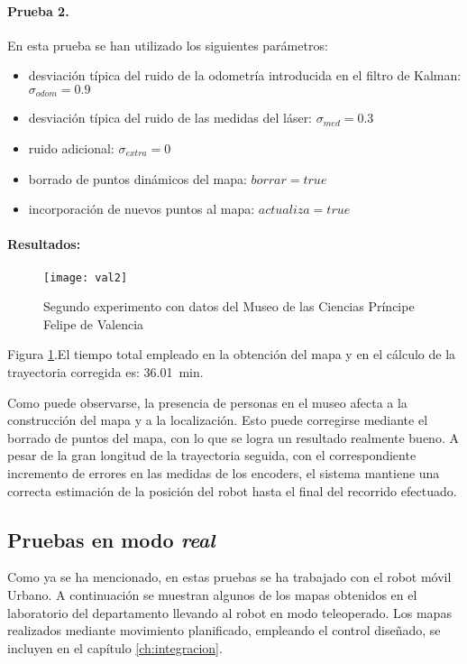 \paragraph{Prueba 2.} En esta prueba se han utilizado los siguientes parámetros:
\begin{itemize}
  \item desviación típica del ruido de la odometría introducida en el filtro de Kalman: $\sigma_{odom} = 0.9$
  \item desviación típica del ruido de las medidas del láser: $\sigma_{med} = 0.3$
  \item ruido adicional: $\sigma_{extra} = 0$
  \item borrado de puntos dinámicos del mapa: $borrar = true$
  \item incorporación de nuevos puntos al mapa: $actualiza = true$
\end{itemize}

\paragraph{Resultados:}
\begin{figure}[h]
  \centering\texttt{[image: val2]}\\
  \caption{Segundo experimento con datos del Museo de las Ciencias Príncipe Felipe de Valencia}\label{fg:val2}
\end{figure}

Figura \ref{fg:val2}.El tiempo total empleado en la obtención del mapa y en el cálculo de la trayectoria corregida es: 36.01~min.

Como puede observarse, la presencia de personas en el museo afecta a la construcción del mapa y a la localización. Esto puede corregirse mediante el borrado de puntos del mapa, con lo que se logra un resultado realmente bueno. A pesar de la gran longitud de la trayectoria seguida, con el correspondiente incremento de errores en las medidas de los encoders, el sistema mantiene una correcta estimación de la posición del robot hasta el final del recorrido efectuado.

\subsection{Pruebas en modo \emph{real}}
Como ya se ha mencionado, en estas pruebas se ha trabajado con el robot móvil Urbano. A continuación se muestran algunos de los mapas obtenidos en el laboratorio del departamento llevando al robot en modo teleoperado. Los mapas realizados mediante movimiento planificado, empleando el control diseñado, se incluyen en el capítulo \ref{ch:integracion}.

